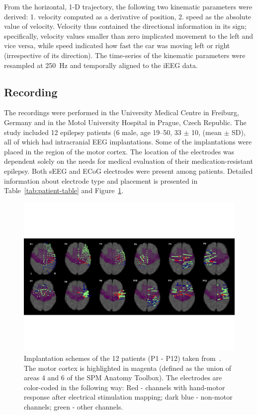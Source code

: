 From the horizontal, 1-D trajectory, the following two kinematic parameters were derived:
1. velocity computed as a derivative of position, 2. speed as the absolute value of velocity.
Velocity thus contained the directional information in its sign;
specifically, velocity values smaller than zero implicated movement to the left and vice versa, while speed indicated how fast the car was moving left or right (irrespective of its direction).
The time-series of the kinematic parameters were resampled at 250~Hz and temporally aligned to the iEEG data.

\subsection{Recording}\label{subsec:recording}
The recordings were performed in the University Medical Centre in Freiburg, Germany and in the Motol University Hospital in Prague, Czech Republic.
The study included 12 epilepsy patients (6 male, age 19--50,  33 $\pm$ 10, (mean $\pm$ SD), all of which had intracranial EEG implantations.
Some of the implantations were placed in the region of the motor cortex.
The location of the electrodes was dependent solely on the needs for medical evaluation of their medication-resistant epilepsy.
Both sEEG and ECoG electrodes were present among patients.
Detailed information about electrode type and placement is presented in Table~\ref{tab:patient-table} and Figure~\ref{fig:electrodes}.

\begin{figure}[!htbp]
\centering
\includegraphics[width=0.8\linewidth]{img/ch3/electrodes}
\caption[Implantation schemes]{Implantation schemes of the 12 patients (P1 - P12) taken from~\cite{Hammer-2021}. The motor cortex is highlighted in magenta (defined as the union of areas 4 and 6 of the SPM Anatomy Toolbox). The electrodes are color-coded in the following way: Red - channels with hand-motor response after electrical stimulation mapping; dark blue - non-motor channels; green - other channels.}
\label{fig:electrodes}
\end{figure}

